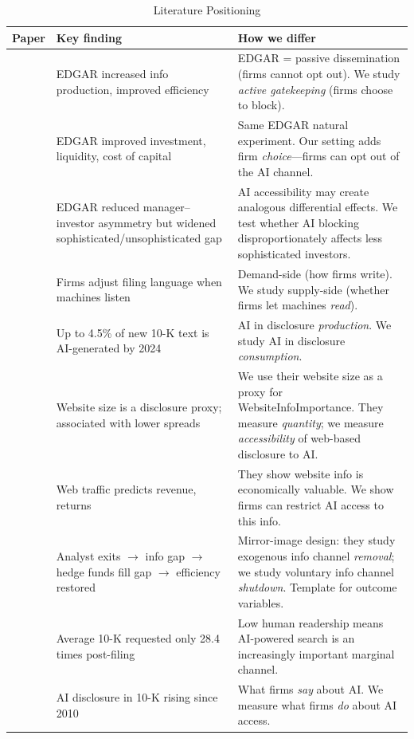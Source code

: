 \documentclass[12pt,a4paper]{article}
\begin{document}
\begin{table}[htbp]
\centering
\caption{Literature Positioning}
\label{tab:lit}
\small
\begin{tabularx}{\textwidth}{p{3.5cm}p{3.5cm}X}
\toprule
\textbf{Paper} & \textbf{Key finding} & \textbf{How we differ} \\
\midrule
\citet{GaoHuang2020} & EDGAR increased info production, improved efficiency & EDGAR = passive dissemination (firms cannot opt out). We study \emph{active gatekeeping} (firms choose to block). \\
\addlinespace
\citet{GoldsteinYangZuo2023} & EDGAR improved investment, liquidity, cost of capital & Same EDGAR natural experiment. Our setting adds firm \emph{choice}---firms can opt out of the AI channel. \\
\addlinespace
\citet{Gomez2024} & EDGAR reduced manager--investor asymmetry but widened sophisticated/unsophisticated gap & AI accessibility may create analogous differential effects. We test whether AI blocking disproportionately affects less sophisticated investors. \\
\addlinespace
\citet{CaoJiangYangZhang2023} & Firms adjust filing language when machines listen & Demand-side (how firms write). We study supply-side (whether firms let machines \emph{read}). \\
\addlinespace
\citet{BlankespoorDeHaanLi2024} & Up to 4.5\% of new 10-K text is AI-generated by 2024 & AI in disclosure \emph{production}. We study AI in disclosure \emph{consumption}. \\
\addlinespace
\citet{BoullandBourveauBreuer2025} & Website size is a disclosure proxy; associated with lower spreads & We use their website size as a proxy for WebsiteInfoImportance. They measure \emph{quantity}; we measure \emph{accessibility} of web-based disclosure to AI. \\
\addlinespace
\citet{ArmstrongKonchitchkiZhang2025} & Web traffic predicts revenue, returns & They show website info is economically valuable. We show firms can restrict AI access to this info. \\
\addlinespace
\citet{ChenKellyWu2020} & Analyst exits $\to$ info gap $\to$ hedge funds fill gap $\to$ efficiency restored & Mirror-image design: they study exogenous info channel \emph{removal}; we study voluntary info channel \emph{shutdown}. Template for outcome variables. \\
\addlinespace
\citet{LoughranMcDonald2017} & Average 10-K requested only 28.4 times post-filing & Low human readership means AI-powered search is an increasingly important marginal channel. \\
\addlinespace
\citet{CaoLiuQiuZhao2024} & AI disclosure in 10-K rising since 2010 & What firms \emph{say} about AI. We measure what firms \emph{do} about AI access. \\
\bottomrule
\end{tabularx}
\end{table}
\end{document}

